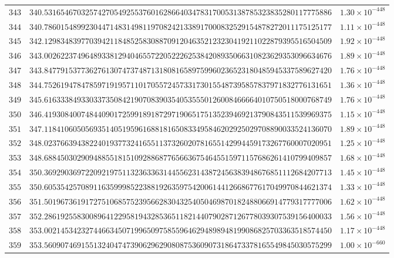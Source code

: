 \documentclass[12pt,reqno]{amsart}
\theoremstyle{remark}
\begin{document}
\begin{longtable}{clc}
$343$ & $340.5316546703257427054925537601628664034783170053138785323835280117775886$ & $1.30\times 10^{-448}$ \\
$344$ & $340.7860154899230447148314981197082421338917000832529154878272011175125177$ & $1.11\times 10^{-448}$ \\
$345$ & $342.1298348397703942118485258308870912046352123230419211022879395516504509$ & $1.92\times 10^{-448}$ \\
$346$ & $343.0026223749648933812940465572205222625384208935066310823629353096634676$ & $1.89\times 10^{-448}$ \\
$347$ & $343.8477915377362761307473748713180816589759960236523180485945337589627420$ & $1.76\times 10^{-448}$ \\
$348$ & $344.7526194784785971919571101705572457331730155487395857837971832776131651$ & $1.36\times 10^{-448}$ \\
$349$ & $345.6163338493303373508421907083903540535550126008466664010750518000768749$ & $1.76\times 10^{-448}$ \\
$350$ & $346.4193084007484409017259918918729719065175135239469213790843511539969375$ & $1.15\times 10^{-448}$ \\
$351$ & $347.1184106050569351405195961688181650833495846202925029708890033524136070$ & $1.89\times 10^{-448}$ \\
$352$ & $348.0237663943822401937732416551137326020781655142994459173267760007020951$ & $1.25\times 10^{-448}$ \\
$353$ & $348.6884503029094885518151092886877656636754645515971157686261410799409857$ & $1.68\times 10^{-448}$ \\
$354$ & $350.3692903697220921975113236336314455623143872456383948676851112684207713$ & $1.45\times 10^{-448}$ \\
$355$ & $350.6053542570891163599985223881926359754200614412668677617049970844621374$ & $1.33\times 10^{-448}$ \\
$356$ & $351.5019673619172751068575239566283043254050469870182488066914779317777006$ & $1.62\times 10^{-448}$ \\
$357$ & $352.2861925583008964122958194328536511821440790287126778039307539156400033$ & $1.56\times 10^{-448}$ \\
$358$ & $353.0021453423274466345071996509758559646294898948199086825703363518574450$ & $1.17\times 10^{-448}$ \\
$359$ & $353.5609074691551324047473906296290808753609073186473378165549845030575299$ & $1.00\times 10^{-660}$ \\

\end{longtable}
\end{document}
